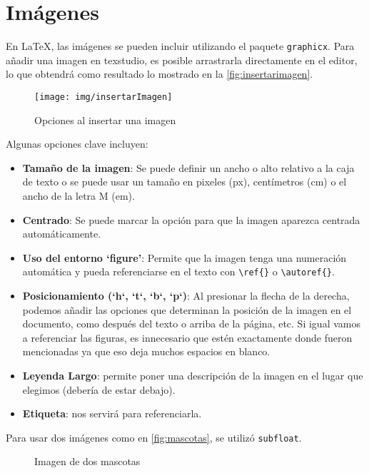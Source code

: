 \section{Imágenes}
En \LaTeX, las imágenes se pueden incluir utilizando el paquete \texttt{graphicx}. 
Para añadir una imagen en texstudio, es posible arrastrarla directamente en el editor, lo que obtendrá como resultado lo mostrado en la \autoref{fig:insertarimagen}.

\begin{figure}[h]
	\centering
	\texttt{[image: img/insertarImagen]}
	\caption{Opciones al insertar una imagen}
	\label{fig:insertarimagen}
\end{figure}

Algunas opciones clave incluyen:

\begin{itemize}
	\item \textbf{Tamaño de la imagen}: Se puede definir un ancho o alto relativo a la caja de texto o se puede usar un tamaño en pixeles (px), centímetros (cm) o el ancho de la letra M (em).
	\item \textbf{Centrado}: Se puede marcar la opción para que la imagen aparezca centrada automáticamente.
	\item \textbf{Uso del entorno `figure'}: Permite que la imagen tenga una numeración automática y pueda referenciarse en el texto con \texttt{\textbackslash ref\{\}} o \texttt{\textbackslash autoref\{\}}.
	\item \textbf{Posicionamiento (`h`, `t`, `b`, `p`)}: Al presionar la flecha de la derecha, podemos añadir las opciones que determinan la posición de la imagen en el documento, como después del texto o arriba de la página, etc. Si igual vamos a referenciar las figuras, es innecesario que estén exactamente donde fueron mencionadas ya que eso deja muchos espacios en blanco.
	\item \textbf{Leyenda Largo}: permite poner una descripción de la imagen en el lugar que elegimos (debería de estar debajo).
	\item \textbf{Etiqueta}: nos servirá para referenciarla. 
\end{itemize}

Para usar dos imágenes como en \autoref{fig:mascotas}, se utilizó \texttt{subfloat}.
\begin{figure}[h]
	\centering
	\hfill
	\caption{Imagen de dos mascotas}
	\label{fig:mascotas}
\end{figure}